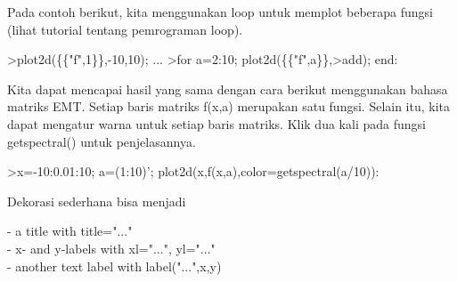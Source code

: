 \documentclass{article}
\begin{document}
\begin{eulernotebook}
\begin{eulercomment}
\begin{eulercomment}
\begin{eulercomment}
\begin{eulercomment}
\begin{eulercomment}
Pada contoh berikut, kita menggunakan loop untuk memplot beberapa
fungsi (lihat tutorial tentang pemrograman loop).
\end{eulercomment}
\begin{eulerprompt}
>plot2d(\{\{"f",1\}\},-10,10); ...
>for a=2:10; plot2d(\{\{"f",a\}\},>add); end:
\end{eulerprompt}
\begin{eulercomment}
Kita dapat mencapai hasil yang sama dengan cara berikut menggunakan
bahasa matriks EMT. Setiap baris matriks f(x,a) merupakan satu fungsi.
Selain itu, kita dapat mengatur warna untuk setiap baris matriks. Klik
dua kali pada fungsi getspectral() untuk penjelasannya.
\end{eulercomment}
\begin{eulerprompt}
>x=-10:0.01:10; a=(1:10)'; plot2d(x,f(x,a),color=getspectral(a/10)):
\end{eulerprompt}
\begin{eulercomment}
Dekorasi sederhana bisa menjadi

- a title with title="..."\\
- x- and y-labels with xl="...", yl="..."\\
- another text label with label("...",x,y)


\end{eulercomment}
\end{eulercomment}
\end{eulercomment}
\end{eulercomment}
\end{eulercomment}
\end{eulernotebook}
\end{document}
